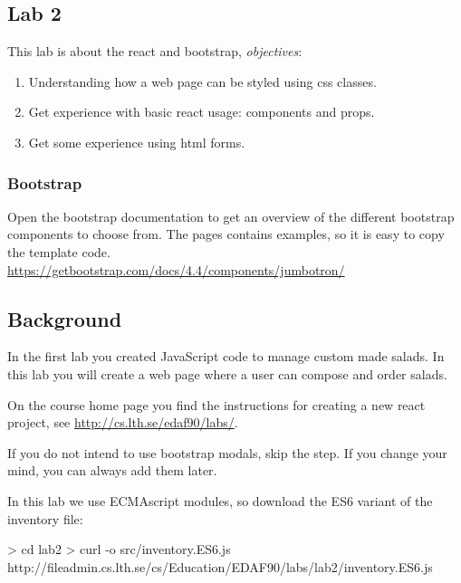 \documentclass[fleqn, article, a4paper]{memoir}
\begin{document}
\maketitle
\thispagestyle{titlepage}
\vspace{-4cm}

\subsection*{Lab 2}

\n This lab is about the react and bootstrap, \emph{objectives}:

\begin{enumerate}\firmlist
\item Understanding how a web page can be styled using css classes.
\item Get experience with basic react usage: components and props.
\item Get some experience using html forms.
\end{enumerate}

\subsubsection*{Bootstrap}
Open the bootstrap documentation to get an overview of the different bootstrap components to choose from. The pages contains examples, so it is easy to copy the template code.
\\ \url{https://getbootstrap.com/docs/4.4/components/jumbotron/}

\subsection*{Background}

In the first lab you created JavaScript code to manage custom made salads. In this lab you will create a web page where a user can compose and order salads.

On the course home page you find the instructions for creating a new react project, see \url{http://cs.lth.se/edaf90/labs/}.

If you do not intend to use bootstrap modals, skip the  step. If you change your mind, you can always add them later.

In this lab we use ECMAscript modules, so download the ES6 variant of the inventory file:
\begin{Code}
> cd lab2
> curl -o src/inventory.ES6.js 
          http://fileadmin.cs.lth.se/cs/Education/EDAF90/labs/lab2/inventory.ES6.js
\end{Code}
\end{document}
